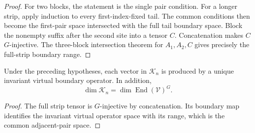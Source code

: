 \begin{proof}\leanok
    For two blocks, the statement is the single pair condition.
    For a longer strip, apply induction to every first-index-fixed
    tail. The common conditions then become the first-pair space
    intersected with the full tail boundary space. Block the
    nonempty suffix after the second site into a tensor $C$.
    Concatenation makes $C$ $G$-injective. The three-block
    intersection theorem for $A_1,A_2,C$ gives precisely the
    full-strip boundary range.
\end{proof}

\begin{corollary}%
    \label{cor:peps_g_injective_strip_parent_boundary}
    \leanok
    Under the preceding hypotheses, each vector in $\mathcal K_n$
    is produced by a unique invariant virtual boundary operator.
    In addition,
    \[
        \dim\mathcal K_n=\dim\operatorname{End}(\mathcal V)^G.
    \]
\end{corollary}

\begin{proof}\leanok
    The full strip tensor is $G$-injective by concatenation. Its
    boundary map identifies the invariant virtual operator space
    with its range, which is the common adjacent-pair space.
\end{proof}
